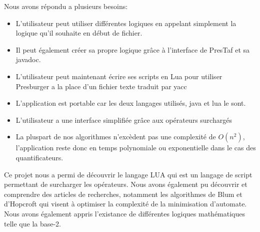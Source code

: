 \documentclass[12pt]{article}%
\begin{document}
Nous avons répondu a plusieurs besoins:
	\begin{itemize}
\item L'utilisateur peut utiliser différentes logiques en appelant simplement la logique qu'il souhaite en début de fichier.
\item Il peut également créer sa propre logique grâce à l'interface de PresTaf et sa javadoc.
\item L'utilisateur peut maintenant écrire ses scripts en Lua pour utiliser Presburger a la place d'un fichier texte traduit par yacc
\item L'application est portable car les deux langages utilisés, java et lua le sont.
\item L'utilisateur a une interface simplifiée grâce aux opérateurs surchargés
\item La pluspart de nos algorithmes n'excèdent pas une complexité de $O(n^2)$, l'application reste donc en temps polynomiale ou exponentielle dans le cas des quantificateurs.
\end{itemize}

Ce projet nous a permi de découvrir le langage LUA qui est un langage de script permettant de surcharger les opérateurs. Nous avons également pu découvrir et comprendre des articles de recherches, notamment les algorithmes de Blum et d'Hopcroft qui visent à optimiser la complexité de la minimisation d'automate. Nous avons également appris l'existance de différentes logiques mathématiques telle que la base-2.


\appendix





%


%

\printglossaries

{}

\end{document}
